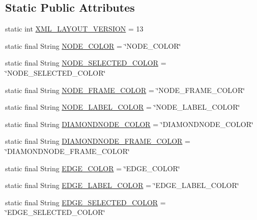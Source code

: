 \subsection*{Static Public Attributes}
\begin{DoxyCompactItemize}
\item 
static int \hyperlink{classorg_1_1tzi_1_1use_1_1gui_1_1views_1_1diagrams_1_1_diagram_options_ac7fbcc0bc73564310819273293265b29}{X\-M\-L\-\_\-\-L\-A\-Y\-O\-U\-T\-\_\-\-V\-E\-R\-S\-I\-O\-N} = 13
\item 
static final String \hyperlink{classorg_1_1tzi_1_1use_1_1gui_1_1views_1_1diagrams_1_1_diagram_options_ac58b5df885bc4a652c20422fd24e451a}{N\-O\-D\-E\-\_\-\-C\-O\-L\-O\-R} = \char`\"{}N\-O\-D\-E\-\_\-\-C\-O\-L\-O\-R\char`\"{}
\item 
static final String \hyperlink{classorg_1_1tzi_1_1use_1_1gui_1_1views_1_1diagrams_1_1_diagram_options_a23ee966231739a402e09ae26fd88b16e}{N\-O\-D\-E\-\_\-\-S\-E\-L\-E\-C\-T\-E\-D\-\_\-\-C\-O\-L\-O\-R} = \char`\"{}N\-O\-D\-E\-\_\-\-S\-E\-L\-E\-C\-T\-E\-D\-\_\-\-C\-O\-L\-O\-R\char`\"{}
\item 
static final String \hyperlink{classorg_1_1tzi_1_1use_1_1gui_1_1views_1_1diagrams_1_1_diagram_options_adc45215cc4e5c1ba25b8ceb5a7ac84d9}{N\-O\-D\-E\-\_\-\-F\-R\-A\-M\-E\-\_\-\-C\-O\-L\-O\-R} = \char`\"{}N\-O\-D\-E\-\_\-\-F\-R\-A\-M\-E\-\_\-\-C\-O\-L\-O\-R\char`\"{}
\item 
static final String \hyperlink{classorg_1_1tzi_1_1use_1_1gui_1_1views_1_1diagrams_1_1_diagram_options_a9e3f71a33c061c43dea500a872bd1cd1}{N\-O\-D\-E\-\_\-\-L\-A\-B\-E\-L\-\_\-\-C\-O\-L\-O\-R} = \char`\"{}N\-O\-D\-E\-\_\-\-L\-A\-B\-E\-L\-\_\-\-C\-O\-L\-O\-R\char`\"{}
\item 
static final String \hyperlink{classorg_1_1tzi_1_1use_1_1gui_1_1views_1_1diagrams_1_1_diagram_options_a76e004b5dcbacf844ce3e78aca2cb052}{D\-I\-A\-M\-O\-N\-D\-N\-O\-D\-E\-\_\-\-C\-O\-L\-O\-R} = \char`\"{}D\-I\-A\-M\-O\-N\-D\-N\-O\-D\-E\-\_\-\-C\-O\-L\-O\-R\char`\"{}
\item 
static final String \hyperlink{classorg_1_1tzi_1_1use_1_1gui_1_1views_1_1diagrams_1_1_diagram_options_a2244ea478630b9da3985dd2138cb68cf}{D\-I\-A\-M\-O\-N\-D\-N\-O\-D\-E\-\_\-\-F\-R\-A\-M\-E\-\_\-\-C\-O\-L\-O\-R} = \char`\"{}D\-I\-A\-M\-O\-N\-D\-N\-O\-D\-E\-\_\-\-F\-R\-A\-M\-E\-\_\-\-C\-O\-L\-O\-R\char`\"{}
\item 
static final String \hyperlink{classorg_1_1tzi_1_1use_1_1gui_1_1views_1_1diagrams_1_1_diagram_options_a0b2c198c7d1c2e7230d237eafafc0824}{E\-D\-G\-E\-\_\-\-C\-O\-L\-O\-R} = \char`\"{}E\-D\-G\-E\-\_\-\-C\-O\-L\-O\-R\char`\"{}
\item 
static final String \hyperlink{classorg_1_1tzi_1_1use_1_1gui_1_1views_1_1diagrams_1_1_diagram_options_a63b58df94c681018013a86a71851f57d}{E\-D\-G\-E\-\_\-\-L\-A\-B\-E\-L\-\_\-\-C\-O\-L\-O\-R} = \char`\"{}E\-D\-G\-E\-\_\-\-L\-A\-B\-E\-L\-\_\-\-C\-O\-L\-O\-R\char`\"{}
\item 
static final String \hyperlink{classorg_1_1tzi_1_1use_1_1gui_1_1views_1_1diagrams_1_1_diagram_options_a0eb368d550d8e89ca4a38eec737e68a7}{E\-D\-G\-E\-\_\-\-S\-E\-L\-E\-C\-T\-E\-D\-\_\-\-C\-O\-L\-O\-R} = \char`\"{}E\-D\-G\-E\-\_\-\-S\-E\-L\-E\-C\-T\-E\-D\-\_\-\-C\-O\-L\-O\-R\char`\"{}
\end{DoxyCompactItemize}
